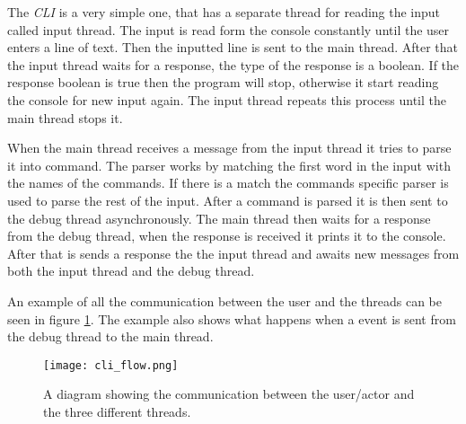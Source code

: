 The \emph{CLI} is a very simple one, that has a separate thread for reading the input called input thread.
The input is read form the console constantly until the user enters a line of text.
Then the inputted line is sent to the main thread.
After that the input thread waits for a response, the type of the response is a boolean.
If the response boolean is true then the program will stop, otherwise it start reading the console for new input again.
The input thread repeats this process until the main thread stops it.


When the main thread receives a message from the input thread it tries to parse it into command.
The parser works by matching the first word in the input with the names of the commands.
If there is a match the commands specific parser is used to parse the rest of the input.
After a command is parsed it is then sent to the debug thread asynchronously.
The main thread then waits for a response from the debug thread, when the response is received it prints it to the console.
After that is sends a response the the input thread and awaits new messages from both the input thread and the debug thread.


An example of all the communication between the user and the threads can be seen in figure \ref{fig:cliflow}.
The example also shows what happens when a event is sent from the debug thread to the main thread.


\begin{figure}[h]
	\centering
	\texttt{[image: cli\_flow.png]}
	\caption{A diagram showing the communication between the user/actor and the three different threads.}
	\label{fig:cliflow}
\end{figure}

